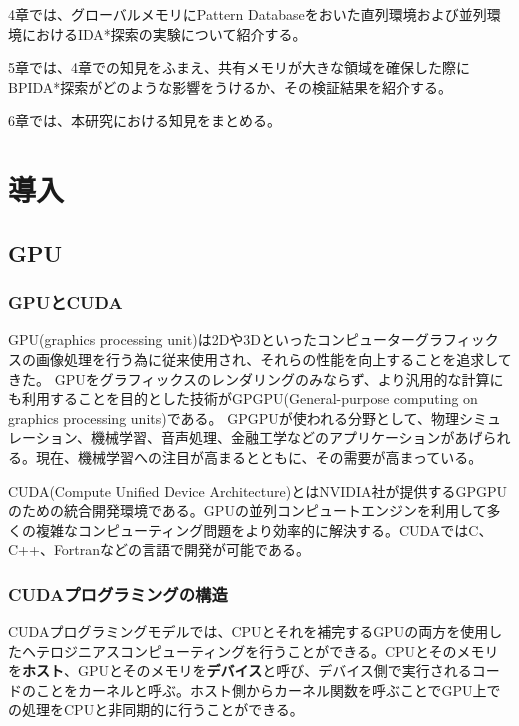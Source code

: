 \documentclass[a4paper,11pt,oneside,openany]{jsbook}
\begin{document}
4章では、グローバルメモリにPattern Databaseをおいた直列環境および並列環境におけるIDA*探索の実験について紹介する。

5章では、4章での知見をふまえ、共有メモリが大きな領域を確保した際にBPIDA*探索がどのような影響をうけるか、その検証結果を紹介する。

6章では、本研究における知見をまとめる。

\chapter{導入}
\section{GPU}
\subsection{GPUとCUDA}
GPU(graphics processing unit)は2Dや3Dといったコンピューターグラフィックスの画像処理を行う為に従来使用され、それらの性能を向上することを追求してきた。
GPUをグラフィックスのレンダリングのみならず、より汎用的な計算にも利用することを目的とした技術がGPGPU(General-purpose computing on graphics processing units)である。
GPGPUが使われる分野として、物理シミュレーション、機械学習、音声処理、金融工学などのアプリケーションがあげられる。現在、機械学習への注目が高まるとともに、その需要が高まっている。

CUDA(Compute Unified Device Architecture)とはNVIDIA社が提供するGPGPUのための統合開発環境である。GPUの並列コンピュートエンジンを利用して多くの複雑なコンピューティング問題をより効率的に解決する。CUDAではC、C++、Fortranなどの言語で開発が可能である。

\subsection{CUDAプログラミングの構造}
CUDAプログラミングモデルでは、CPUとそれを補完するGPUの両方を使用したヘテロジニアスコンピューティングを行うことができる。CPUとそのメモリを{\bf ホスト}、GPUとそのメモリを{\bf デバイス}と呼び、デバイス側で実行されるコードのことをカーネルと呼ぶ。ホスト側からカーネル関数を呼ぶことでGPU上での処理をCPUと非同期的に行うことができる。
\end{document}
